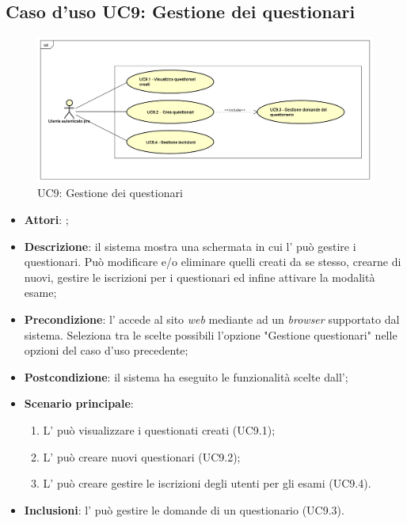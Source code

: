 \subsection{Caso d'uso UC9: Gestione dei questionari}
\label{UC9}
\begin{figure}[h]
	\centering
	\includegraphics[scale=0.5,keepaspectratio]{UML/UC9.png}
	\caption{UC9: Gestione dei questionari}
\end{figure}
\FloatBarrier
\begin{itemize}
	\item \textbf{Attori}: \uaupro{};
	\item \textbf{Descrizione}: il sistema mostra una schermata in cui l'\uaupro{} può gestire i questionari. Può modificare e/o eliminare quelli creati da se stesso, crearne di nuovi, gestire le iscrizioni per i questionari ed infine attivare la modalità esame; 
	\item \textbf{Precondizione}: l'\uaupro{} accede al sito \textit{web} mediante ad un \textit{browser} supportato dal sistema. Seleziona tra le scelte possibili l'opzione "Gestione questionari" nelle opzioni del caso d'uso precedente;
	\item \textbf{Postcondizione}: il sistema ha eseguito le funzionalità scelte dall'\uaupro{};
	\item \textbf{Scenario principale}:
		\begin{enumerate}
			\item L'\uaupro{} può visualizzare i questionati creati (UC9.1);
			\item L'\uaupro{} può creare nuovi questionari (UC9.2);
			\item L'\uaupro{} può creare gestire le iscrizioni degli utenti per gli esami (UC9.4).
		\end{enumerate}
		\item \textbf{Inclusioni}: l'\uaupro{} può gestire le domande di un questionario (UC9.3).		
\end{itemize}
							
